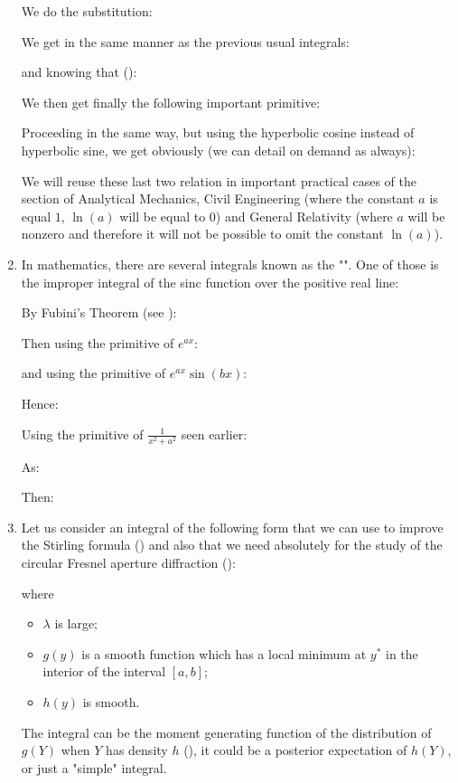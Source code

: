 \begin{enumerate}
		We do the substitution:
		
		We get in the same manner as the previous usual integrals:
		
		and knowing that ():
		
		We then get finally the following important primitive:
		
		Proceeding in the same way, but using the hyperbolic cosine instead of hyperbolic sine, we get obviously (we can detail on demand as always):
		
		We will reuse these last two relation in important practical cases of the section of Analytical Mechanics, Civil Engineering (where the constant $a$ is equal $1$, $\ln(a)$ will be equal to $0$) and General Relativity (where $a$ will be nonzero and therefore it will not be possible to omit the constant $\ln(a)$).
		
		\item In mathematics, there are several integrals known as the "\label{Dirichlet integral}". One of those is the improper integral of the sinc function over the positive real line:
	
	By Fubini's Theorem (see \pageref{fubini theorem}):
	
	Then using the primitive of $e^{ax}$:
	
	and using the primitive of $e^{ax}\sin(bx)$:
	
	Hence:

	Using the primitive of $\frac{1}{x^2+a^2}$ seen earlier:
	
	As:
	
	Then:
	
		
		\item Let us consider an integral of the following form that we can use to improve the Stirling formula () and also that we need absolutely for the study of the circular Fresnel aperture diffraction ():
		
		where
		\begin{itemize}
			\item $\lambda$ is large;
			\item $g(y)$ is a smooth function which has a local minimum at $y^*$ in the interior of the interval $[a, b]$;
			\item $h(y)$ is smooth.
		\end{itemize}
		The integral can be the moment generating function of the
		distribution of $g(Y)$ when $Y$ has density $h$ (), it could be a posterior expectation of $h(Y)$, or just a "simple" integral.
		

\end{enumerate}
